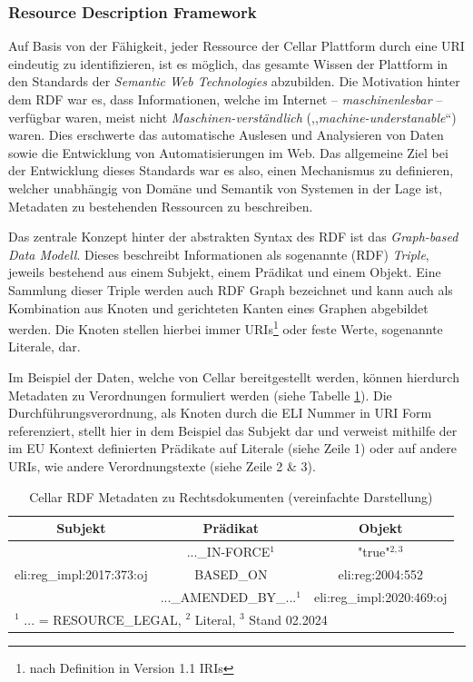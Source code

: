 \subsubsection{Resource Description Framework}

Auf Basis von der Fähigkeit, jeder Ressource der Cellar Plattform durch eine \ac{URI} eindeutig zu identifizieren, ist es möglich, das gesamte Wissen der Plattform in den Standards der \textit{Semantic Web Technologies} abzubilden.
Die Motivation hinter dem \acf{RDF} war es, dass Informationen, welche im Internet -- \textit{maschinenlesbar} -- verfügbar waren, meist nicht \textit{Maschinen-verständlich} (,,\textit{machine-understanable}``) waren.
Dies erschwerte das automatische Auslesen und Analysieren von Daten sowie die Entwicklung von Automatisierungen im Web.
Das allgemeine Ziel bei der Entwicklung dieses Standards war es also, einen Mechanismus zu definieren, welcher unabhängig von Domäne und Semantik von Systemen in der Lage ist, Metadaten zu bestehenden Ressourcen zu beschreiben. \cite[Abs. 1]{eu_rdf_w3c} 

Das zentrale Konzept hinter der abstrakten Syntax des \ac{RDF} ist das \textit{Graph-based Data Modell}.
Dieses beschreibt Informationen als sogenannte (\ac{RDF}) \textit{Triple}, jeweils bestehend aus einem Subjekt, einem Prädikat und einem Objekt. 
Eine Sammlung dieser Triple werden auch \ac{RDF} Graph bezeichnet und kann auch als Kombination aus Knoten und gerichteten Kanten eines Graphen abgebildet werden.
Die Knoten stellen hierbei immer \acp{URI}\footnote{nach Definition in Version 1.1 \acp{IRI}} oder feste Werte, sogenannte Literale, dar.
\cite[Abs. 1.1]{eu_rdf_concepts}


Im Beispiel der Daten, welche von Cellar bereitgestellt werden, können hierdurch Metadaten zu Verordnungen formuliert werden (siehe Tabelle \ref{tab:rdf_example}).
Die Durchführungsverordnung, als Knoten durch die \ac{ELI} Nummer in \ac{URI} Form referenziert, stellt hier in dem Beispiel das Subjekt dar und verweist mithilfe der im EU Kontext definierten Prädikate auf Literale (siehe Zeile 1) oder auf andere \acp{URI}, wie andere Verordnungstexte (siehe Zeile 2 \& 3). 
\begin{table}[h]
    \centering
    \begin{tabular}{|c|c|c|} \hline
         Subjekt&  Prädikat& Objekt\\ \hline\hline
         &  ...\_IN-FORCE$^1$& "true"$^{2,3}$\\ \cline{2-3}
         eli:reg\_impl:2017:373:oj&  BASED\_ON& eli:reg:2004:552\\ \cline{2-3} 
         &  ...\_AMENDED\_BY\_...$^1$& eli:reg\_impl:2020:469:oj\\ \hline
 \multicolumn{3}{l}{\footnotesize $^1$ ... = RESOURCE\_LEGAL, $^2$ Literal, $^3$ Stand 02.2024}\\
    \end{tabular}
    \caption{Cellar RDF Metadaten zu Rechtsdokumenten (vereinfachte Darstellung)}
    \label{tab:rdf_example}
\end{table}

